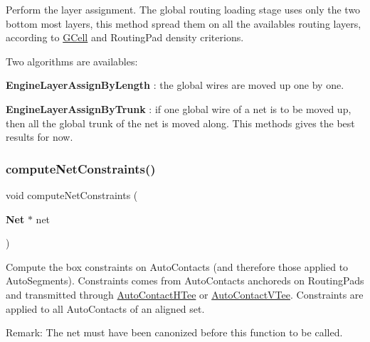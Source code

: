 Perform the layer assignment. The global routing loading stage uses only the two bottom most layers, this method spread them on all the availables routing layers, according to \mbox{\hyperlink{classKatabatic_1_1GCell}{G\+Cell}} and Routing\+Pad density criterions.

Two algorithms are availables\+:
\begin{DoxyItemize}
\item {\bfseries Engine\+Layer\+Assign\+By\+Length} \+: the global wires are moved up one by one.
\item {\bfseries Engine\+Layer\+Assign\+By\+Trunk} \+: if one global wire of a net is to be moved up, then all the global trunk of the net is moved along. This methods gives the best results for now. 
\end{DoxyItemize}\mbox{\label{classKatabatic_1_1KatabaticEngine_a6957a5830a4d6f1b2daf83a7d98df601}} 
\subsubsection{\texorpdfstring{compute\+Net\+Constraints()}{computeNetConstraints()}}
{\footnotesize\ttfamily void compute\+Net\+Constraints (\begin{DoxyParamCaption}\item[{\textbf{ Net} $\ast$}]{net }\end{DoxyParamCaption})}

Compute the box constraints on Auto\+Contacts (and therefore those applied to Auto\+Segments). Constraints comes from Auto\+Contacts anchoreds on Routing\+Pads and transmitted through \mbox{\hyperlink{classKatabatic_1_1AutoContactHTee}{Auto\+Contact\+H\+Tee}} or \mbox{\hyperlink{classKatabatic_1_1AutoContactVTee}{Auto\+Contact\+V\+Tee}}. Constraints are applied to all Auto\+Contacts of an aligned set.

\begin{DoxyParagraph}{Remark\+: The {\ttfamily net} must have been canonized before this function to be called. }

\end{DoxyParagraph}
\mbox{\label{classKatabatic_1_1KatabaticEngine_ad6b9f7d94ee4a88f12c485e48d1e644a}} 
